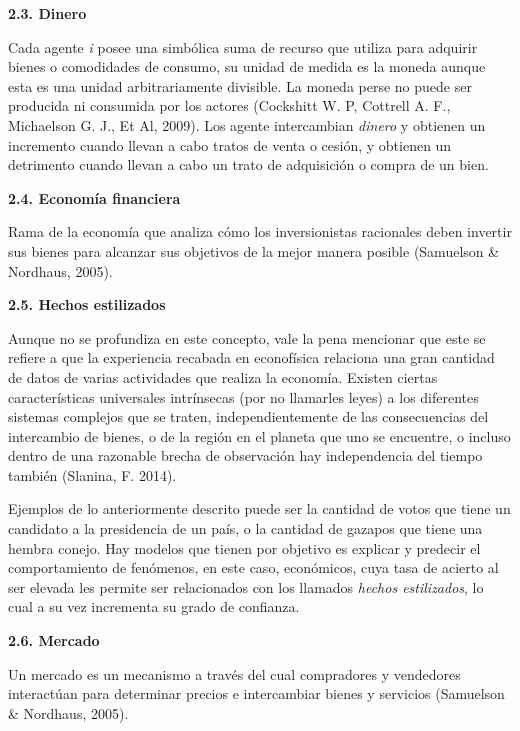 \newpage

{
\noindent
\Large  \textbf{2.3.  Dinero} 
}

Cada agente \textit{i} posee una simbólica suma de recurso que utiliza para adquirir bienes o comodidades de consumo, su unidad de medida es la \guillemotleft moneda \guillemotright aunque esta es una unidad arbitrariamente divisible. La moneda perse no puede ser producida ni consumida por los actores   (Cockshitt W. P, Cottrell A. F., Michaelson G. J., Et  Al, 2009). Los agente intercambian \textit{dinero}  y obtienen un incremento cuando llevan a cabo tratos de venta o cesión, y obtienen un detrimento cuando llevan a cabo un trato de adquisición o compra de un bien. 
\newline


{
\noindent
\Large  \textbf{2.4. Economía financiera} 
}

Rama de la economía que analiza cómo los inversionistas racionales deben invertir sus bienes para alcanzar sus objetivos de la mejor manera posible  (Samuelson \& Nordhaus, 2005).
\newline

{
\noindent
\Large  \textbf{2.5. Hechos estilizados} 
}

Aunque no se profundiza en este concepto, vale la pena mencionar que este  se refiere a que la experiencia recabada en econofísica relaciona una gran cantidad de datos de varias actividades que realiza la economía. Existen ciertas características universales intrínsecas (por no llamarles leyes) a los diferentes sistemas complejos que se traten, independientemente de las consecuencias del intercambio de bienes, o de la región en el planeta que uno se encuentre, o incluso dentro de una razonable brecha de observación hay independencia del tiempo también (Slanina, F. 2014). 
\newline

Ejemplos de lo anteriormente descrito puede ser la cantidad de votos que tiene un candidato a la presidencia de un país, o la cantidad de gazapos que tiene una hembra conejo. Hay modelos que tienen por objetivo es explicar y predecir el comportamiento de fenómenos, en este caso, económicos, cuya tasa de acierto al ser elevada les permite ser relacionados con los llamados \textit{hechos estilizados}, lo cual a su vez incrementa su grado de confianza.    
\newline


{
\noindent
\Large  \textbf{2.6. Mercado} 
}

Un mercado es un mecanismo a través del cual compradores y vendedores interactúan para determinar precios e intercambiar bienes y servicios (Samuelson \& Nordhaus, 2005).
\newpage


